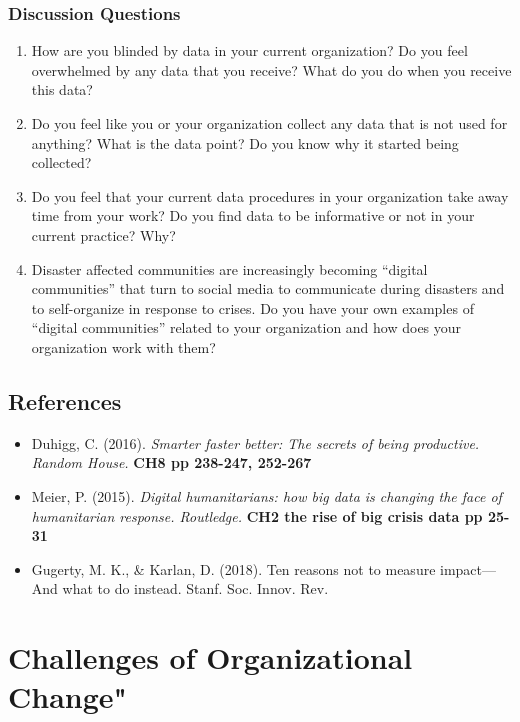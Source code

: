 \documentclass[]{book}
\providecommand{\tightlist}{%
  \setlength{\itemsep}{0pt}\setlength{\parskip}{0pt}}
\theoremstyle{definition}
\theoremstyle{definition}
\theoremstyle{definition}
\theoremstyle{remark}
\begin{document}
\hypertarget{discussion-questions-1}{%
\subsection{Discussion Questions}\label{discussion-questions-1}}

\begin{enumerate}
\def\labelenumi{\arabic{enumi}.}
\item
  How are you blinded by data in your current organization? Do you feel
  overwhelmed by any data that you receive? What do you do when you
  receive this data?
\item
  Do you feel like you or your organization collect any data that is not
  used for anything? What is the data point? Do you know why it started
  being collected?
\item
  Do you feel that your current data procedures in your organization
  take away time from your work? Do you find data to be informative or
  not in your current practice? Why?
\item
  Disaster affected communities are increasingly becoming ``digital
  communities'' that turn to social media to communicate during
  disasters and to self-organize in response to crises. Do you have your
  own examples of ``digital communities'' related to your organization
  and how does your organization work with them?
\end{enumerate}

\hypertarget{references-1}{%
\section{References}\label{references-1}}

\begin{itemize}
\tightlist
\item
  Duhigg, C. (2016). \emph{Smarter faster better: The secrets of being
  productive. Random House.} \textbf{CH8 pp 238-247, 252-267}
\item
  Meier, P. (2015). \emph{Digital humanitarians: how big data is
  changing the face of humanitarian response. Routledge.} \textbf{CH2
  the rise of big crisis data pp 25-31}\\
\item
  Gugerty, M. K., \& Karlan, D. (2018). Ten reasons not to measure
  impact---And what to do instead. Stanf. Soc. Innov. Rev.
\end{itemize}

\hypertarget{challenges-of-organizational-change}{%
\chapter{Challenges of Organizational
Change"}\label{challenges-of-organizational-change}}
\end{document}
